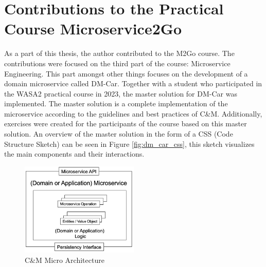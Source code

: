 \pagebreak

\section{Contributions to the Practical Course Microservice2Go}
\label{sec:m2g_contribution}

As a part of this thesis, the author contributed to the M2Go course. The
contributions were focused on the third part of the course: Microservice
Engineering. This part amongst other things focuses on the development of a
domain microservice called DM-Car. Together with a student \cite{La23} who
participated in the WASA2 practical course in 2023, the master solution for
DM-Car was implemented. The master solution is a complete implementation of the
microservice according to the guidelines and best practices of C\&M.
Additionally, exercises were created for the participants of the course based
on this master solution. An overview of the master solution in the form of a
CSS (Code Structure Sketch) can be seen in Figure \ref{fig:dm_car_css}, this
sketch visualizes the main components and their interactions.

\begin{figure}[h]
	\centering
	\includegraphics[width=0.5\textwidth]{figures/micro_architecture.png}
	\caption{C\&M Micro Architecture \cite{CM-W-IMP}}
	\label{fig:micro_architecture}
\end{figure}

